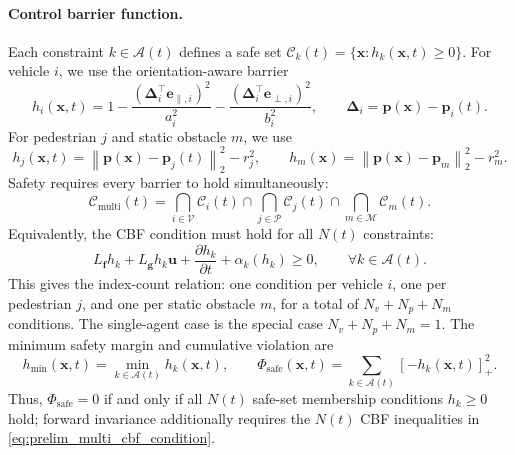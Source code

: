 \paragraph{Control barrier function.}
Each constraint \(k\in\mathcal{A}(t)\) defines a safe set
\(\mathcal{C}_k(t)=\{\mathbf{x}:h_k(\mathbf{x},t)\ge0\}\).  For
vehicle \(i\), we use the orientation-aware barrier
\begin{equation}
    h_i(\mathbf{x},t)
    =
    1
    -
    \frac{\left(\boldsymbol{\Delta}_i^\top
    \mathbf{e}_{\parallel,i}\right)^2}{a_i^2}
    -
    \frac{\left(\boldsymbol{\Delta}_i^\top
    \mathbf{e}_{\perp,i}\right)^2}{b_i^2},
    \qquad
    \boldsymbol{\Delta}_i
    =
    \mathbf{p}(\mathbf{x})-\mathbf{p}_i(t).
    \label{eq:prelim_vehicle_barrier}
\end{equation}
For pedestrian \(j\) and static obstacle \(m\), we use
\begin{equation}
    h_j(\mathbf{x},t)
    =
    \left\|\mathbf{p}(\mathbf{x})-\mathbf{p}_j(t)\right\|_2^2-r_j^2,
    \qquad
    h_m(\mathbf{x})
    =
    \left\|\mathbf{p}(\mathbf{x})-\mathbf{p}_m\right\|_2^2-r_m^2.
    \label{eq:prelim_other_barriers}
\end{equation}
Safety requires every barrier to hold simultaneously:
\begin{equation}
    \mathcal{C}_{\mathrm{multi}}(t)
    =
    \bigcap_{i\in\mathcal{V}}\mathcal{C}_i(t)
    \cap
    \bigcap_{j\in\mathcal{P}}\mathcal{C}_j(t)
    \cap
    \bigcap_{m\in\mathcal{M}}\mathcal{C}_m(t).
    \label{eq:prelim_multi_safe_set}
\end{equation}
Equivalently, the CBF condition must hold for all \(N(t)\) constraints:
\begin{equation}
    L_{\mathbf{f}}h_k
    +
    L_{\mathbf{g}}h_k\mathbf{u}
    +
    \frac{\partial h_k}{\partial t}
    +
    \alpha_k(h_k)
    \ge0,
    \qquad
    \forall k\in\mathcal{A}(t).
    \label{eq:prelim_multi_cbf_condition}
\end{equation}
This gives the index-count relation: one condition per vehicle \(i\),
one per pedestrian \(j\), and one per static obstacle \(m\), for a total
of \(N_v+N_p+N_m\) conditions.  The single-agent case is the special
case \(N_v+N_p+N_m=1\).  The minimum safety margin and cumulative
violation are
\begin{equation}
    h_{\min}(\mathbf{x},t)
    =
    \min_{k\in\mathcal{A}(t)}h_k(\mathbf{x},t),
    \qquad
    \Phi_{\mathrm{safe}}(\mathbf{x},t)
    =
    \sum_{k\in\mathcal{A}(t)}
    \left[-h_k(\mathbf{x},t)\right]_+^2 .
    \label{eq:prelim_safety_aggregate}
\end{equation}
Thus, \(\Phi_{\mathrm{safe}}=0\) if and only if all \(N(t)\)
safe-set membership conditions \(h_k\ge0\) hold; forward invariance
additionally requires the \(N(t)\) CBF inequalities in
\eqref{eq:prelim_multi_cbf_condition}.

